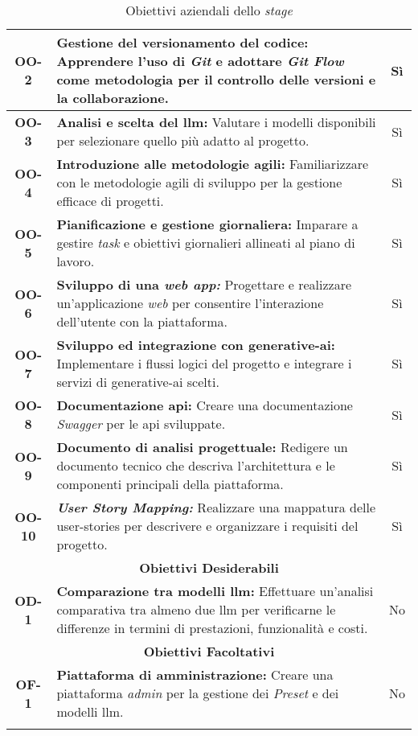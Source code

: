 \begin{longtable}{|c|>{\centering\arraybackslash}p{}|c|}
    \hline
    \textbf{OO-2} & \textbf{Gestione del versionamento del codice:} Apprendere l'uso di \textit{Git} e adottare \textit{Git Flow} come metodologia per il controllo delle versioni e la collaborazione. & Sì\\
    \hline
    \textbf{OO-3} & \textbf{Analisi e scelta del \gls{llm}:} Valutare i modelli disponibili per selezionare quello più adatto al progetto.& Sì \\
    \hline
    \textbf{OO-4} & \textbf{Introduzione alle metodologie agili:} Familiarizzare con le metodologie agili di sviluppo per la gestione efficace di progetti. & Sì\\
    \hline
    \textbf{OO-5} & \textbf{Pianificazione e gestione giornaliera:} Imparare a gestire \textit{task} e obiettivi giornalieri allineati al piano di lavoro. & Sì\\
    \hline
    \textbf{OO-6} & \textbf{Sviluppo di una \textit{web app:}} Progettare e realizzare un'applicazione \textit{web} per consentire l'interazione dell'utente con la piattaforma. & Sì\\
    \hline
    \textbf{OO-7} & \textbf{Sviluppo ed integrazione con \gls{generative-ai}:} Implementare i flussi logici del progetto e integrare i servizi di \gls{generative-ai} scelti. & Sì\\
    \hline
    \textbf{OO-8} & \textbf{Documentazione \gls{api}:} Creare una documentazione \textit{Swagger} per le \gls{api} sviluppate.& Sì \\
    \hline
    \textbf{OO-9} & \textbf{Documento di analisi progettuale:} Redigere un documento tecnico che descriva l'architettura e le componenti principali della piattaforma.& Sì \\
    \hline
    \textbf{OO-10} & \textbf{\textit{User Story Mapping:}} Realizzare una mappatura delle \gls{user-stories} per descrivere e organizzare i requisiti del progetto.& Sì \\
    \hline
    \multicolumn{3}{|c|}{\rowcolor{green!30} \textbf{Obiettivi Desiderabili}} \\
    \hline %
    \textbf{OD-1} & \textbf{Comparazione tra modelli \gls{llm}:} Effettuare un'analisi comparativa tra almeno due \gls{llm} per verificarne le differenze in termini di prestazioni, funzionalità e costi.& No \\
    \hline
    \multicolumn{3}{|c|}{\rowcolor{green!30} \textbf{Obiettivi Facoltativi}} \\
    \hline %
    \textbf{OF-1} & \textbf{Piattaforma di amministrazione:} Creare una piattaforma \textit{admin} per la gestione dei \textit{Preset} e dei modelli \gls{llm}.& No \\
    \hline
    \caption{Obiettivi aziendali dello \textit{stage}} %
    \label{tab:raggiungimento_obiettivi_stage} %
\end{longtable}

